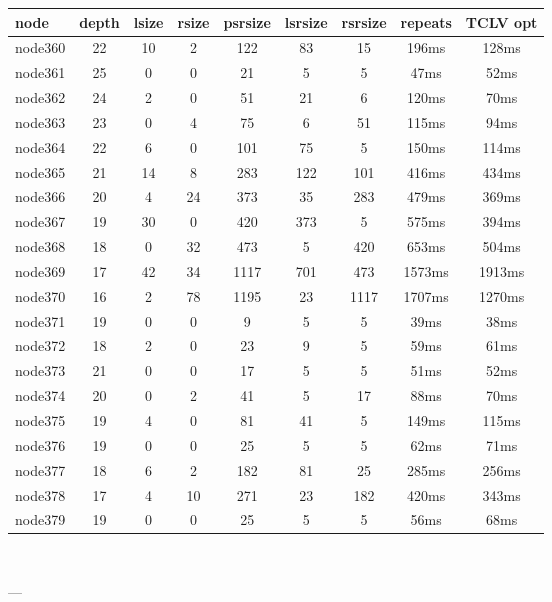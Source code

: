 \begin{tabular}{|l|c|c|c|c|c|c|c|c|}
\hline node & depth & lsize & rsize & psrsize & lsrsize & rsrsize   & repeats & TCLV opt\\
    \hline node360 & 22 & 10 & 2 & 122 & 83 & 15 & 196ms & 128ms\\
    \hline node361 & 25 & 0 & 0 & 21 & 5 & 5 & 47ms & 52ms\\
    \hline node362 & 24 & 2 & 0 & 51 & 21 & 6 & 120ms & 70ms\\
    \hline node363 & 23 & 0 & 4 & 75 & 6 & 51 & 115ms & 94ms\\
    \hline node364 & 22 & 6 & 0 & 101 & 75 & 5 & 150ms & 114ms\\
    \hline node365 & 21 & 14 & 8 & 283 & 122 & 101 & 416ms & 434ms\\
    \hline node366 & 20 & 4 & 24 & 373 & 35 & 283 & 479ms & 369ms\\
    \hline node367 & 19 & 30 & 0 & 420 & 373 & 5 & 575ms & 394ms\\
    \hline node368 & 18 & 0 & 32 & 473 & 5 & 420 & 653ms & 504ms\\
    \hline node369 & 17 & 42 & 34 & 1117 & 701 & 473 & 1573ms & 1913ms\\
    \hline node370 & 16 & 2 & 78 & 1195 & 23 & 1117 & 1707ms & 1270ms\\
    \hline node371 & 19 & 0 & 0 & 9 & 5 & 5 & 39ms & 38ms\\
    \hline node372 & 18 & 2 & 0 & 23 & 9 & 5 & 59ms & 61ms\\
    \hline node373 & 21 & 0 & 0 & 17 & 5 & 5 & 51ms & 52ms\\
    \hline node374 & 20 & 0 & 2 & 41 & 5 & 17 & 88ms & 70ms\\
    \hline node375 & 19 & 4 & 0 & 81 & 41 & 5 & 149ms & 115ms\\
    \hline node376 & 19 & 0 & 0 & 25 & 5 & 5 & 62ms & 71ms\\
    \hline node377 & 18 & 6 & 2 & 182 & 81 & 25 & 285ms & 256ms\\
    \hline node378 & 17 & 4 & 10 & 271 & 23 & 182 & 420ms & 343ms\\
    \hline node379 & 19 & 0 & 0 & 25 & 5 & 5 & 56ms & 68ms\\

\hline
\end{tabular} \

---



